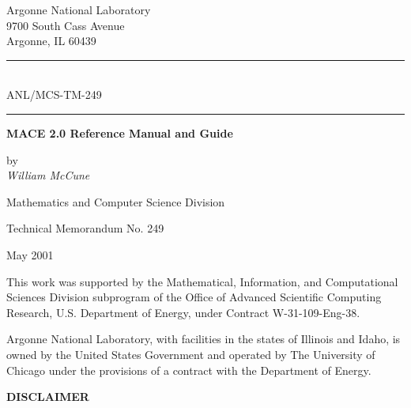 \documentclass[11pt]{article}
\begin{document}
 \sloppy
{}
\setcounter{page}{1}
\thispagestyle{empty}
\begin{center}
\vspace*{-1in}
Argonne National Laboratory \\
9700 South Cass Avenue\\
Argonne, IL 60439

\vspace{.2in}
\rule{1.5in}{.01in}\\ [1ex]
ANL/MCS-TM-249 \\
\rule{1.5in}{.01in}


\vspace{1in}
{\Large\bf MACE 2.0 Reference Manual and Guide}

\vspace{.2in}
by \\ [3ex]

{\Large\it William McCune}\\
\thispagestyle{empty}

\vspace{1.5in}
Mathematics and Computer Science Division

\bigskip

Technical Memorandum No. 249

\vspace{1in}
May 2001
\end{center}

\vfill
\noindent
This work was supported by the Mathematical,
Information, and Computational Sciences Division subprogram of the
Office of Advanced Scientific Computing Research, U.S. Department of
Energy, under Contract W-31-109-Eng-38.


\newpage
{}
\setcounter{page}{2}
\noindent
Argonne National Laboratory, with facilities in the states of Illinois
and Idaho, is owned by the United States Government and operated by The
University of Chicago under the provisions of a contract with the
Department of Energy.

\vspace{2in}

\begin{center}
{\bf DISCLAIMER}
\end{center}
\end{document}
